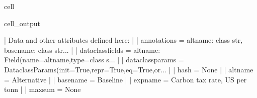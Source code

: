 \documentclass[letterpaper,10pt,english]{jupyterBook}
\begin{document}
\begin{sphinxuseclass}{cell}
\begin{sphinxVerbatimOutput}
\begin{sphinxuseclass}{cell_output}
\begin{sphinxVerbatim}[commandchars=\\\{\}]
     |  Data and other attributes defined here:
     |  
     |  \PYGZus{}\PYGZus{}annotations\PYGZus{}\PYGZus{} = \PYGZob{}\PYGZsq{}altname\PYGZsq{}: \PYGZlt{}class \PYGZsq{}str\PYGZsq{}\PYGZgt{}, \PYGZsq{}basename\PYGZsq{}: \PYGZlt{}class \PYGZsq{}str\PYGZsq{}\PYGZgt{}...
     |  
     |  \PYGZus{}\PYGZus{}dataclass\PYGZus{}fields\PYGZus{}\PYGZus{} = \PYGZob{}\PYGZsq{}altname\PYGZsq{}: Field(name=\PYGZsq{}altname\PYGZsq{},type=\PYGZlt{}class \PYGZsq{}s...
     |  
     |  \PYGZus{}\PYGZus{}dataclass\PYGZus{}params\PYGZus{}\PYGZus{} = \PYGZus{}DataclassParams(init=True,repr=True,eq=True,or...
     |  
     |  \PYGZus{}\PYGZus{}hash\PYGZus{}\PYGZus{} = None
     |  
     |  altname = \PYGZsq{}Alternative\PYGZsq{}
     |  
     |  basename = \PYGZsq{}Baseline\PYGZsq{}
     |  
     |  expname = \PYGZsq{}Carbon tax rate, US\PYGZdl{} per tonn \PYGZsq{}
     |  
     |  maxsum = None
    

\end{sphinxVerbatim}
\end{sphinxuseclass}
\end{sphinxVerbatimOutput}
\end{sphinxuseclass}
\end{document}
